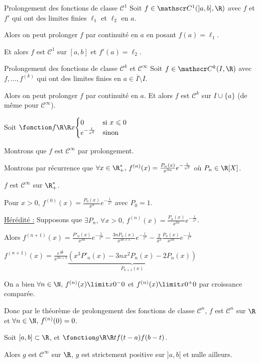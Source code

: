 \begin{theoreme}{Prolongement des fonctions de classe $\mathscr C^1$}{}
    Soit $f \in \mathscr C^1(]a, b], \R)$ avec $f$ et $f'$ qui ont des limites finies 
    $\ell_1$ et $\ell_2$ en $a$. 

    Alors on peut prolonger $f$ par continuité en $a$ en posant $f(a) = \ell_1$.

    Et alors $f$ est $\mathscr C^1$ sur $[a, b]$ et $f'(a) = \ell_2$.
\end{theoreme}

\begin{theoreme}{Prolongement des fonctions de classe $\mathscr C^k$ et $\mathscr C^{\infty}$}{}
    Soit $f \in \mathscr C^k(I, \R)$ avec $f,\dots,f^{(k)}$ qui ont des limites finies en $a \in \overline{I} \setminus I$. 

    Alors on peut prolonger $f$ par continuité en $a$.
    Et alors $f$ est $\mathscr C^k$ sur $I \cup \{a\}$ (de même pour $\mathscr C^{\infty}$).
\end{theoreme}

\begin{exemple}
    Soit $\fonction f \R \R x {\begin{cases}
        0 & \text{si } x \leqslant 0\\
        e^{-\frac{1}{x^2}} & \text{sinon}
    \end{cases}}$

    Montrons que $f$ est $\mathscr C^{\infty}$ par prolongement.

    Montrons par récurrence que $\forall x \in \R_+^*, \, f^{(n)}(x) = \frac{P_n(x) }{x^{3n}} e^{-\frac{1}{x^2}}$ où $P_n \in \R [X]$. 

    $f$ est $\mathscr C^\infty$ sur $\R_+^*$. 

    Pour $x > 0$, $f^{(0)}(x) = \frac{P_0(x )}{x^0} e^{-\frac{1}{x^2}}$ avec $P_0 = 1$.

    \uline{Hérédité :} Supposons que $\displaystyle \exists P_n, \, \forall x > 0, \, f^{(n)}(x) = \frac{P_n(x)}{x^{3n}} e^{-\frac{1}{x^2}}$.

    Alors $\displaystyle f^{(n+1)}(x) = \frac{P'_n(x)}{x^{3n}} e^{-\frac{1}{x^2}}  - \frac{3n P_n(x)}{x^{3n + 1}}e^{-\frac{1}{x^2}} - \frac 2 {x^3} \frac{P_n(x)}{x^{3n}}e^{-\frac{1}{x^2}}$

    $f^{(n+1)}(x) = \frac{e^{\frac{-1}{x^2}}}{x^{3n + 3}} \underbrace{\left( x^3 P'_n(x) - 3nx^2 P_n(x) - 2P_n(x) \right)}_{P_{n+1}(x)}$

    On a bien $\forall n \in \N, \, f^{(n)}(x) \limit x {0^-} 0 $ et $f^{(n)}(x) \limit x {0^+} 0$ par croissance comparée. 

    Donc par le théorème de prolongement des fonctions de classe $\mathscr C^n$, $f$ est $\mathscr C^n$ sur $\R$ et $\forall n \in \N, \, f^{(n)}(0) = 0$.


    Soit $[a, b] \subset \R$, et $\fonction g \R \R t {f(t-a)f(b-t)}$.

    Alors $g$ est $\mathscr C^\infty$ sur $\R$, $g$ est strictement positive sur $]a, b[$ et nulle ailleurs.
\end{exemple}

